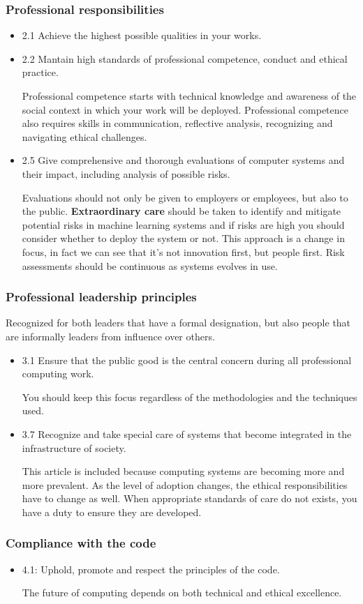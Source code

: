 \subsubsection{Professional responsibilities}
\begin{itemize}
    \item 2.1 Achieve the highest possible qualities in your works.
    \item 2.2 Mantain high standards of professional competence, conduct and ethical practice. 
    
    Professional competence starts with technical knowledge and awareness of the social context in which your work will be deployed. Professional competence also requires skills in communication, reflective analysis, recognizing and navigating ethical challenges.
    \item 2.5 Give comprehensive and thorough evaluations of computer systems and their impact, including analysis of possible risks. 
    
    Evaluations should not only be given to employers or employees, but also to the public. \textbf{Extraordinary care} should be taken to identify and mitigate potential risks in machine learning systems and if risks are high you should consider whether to deploy the system or not. This approach is a change in focus, in fact we can see that it's not innovation first, but people first. Risk assessments should be continuous as systems evolves in use.
\end{itemize}
\subsubsection{Professional leadership principles}
Recognized for both leaders that have a formal designation, but also people that are informally leaders from influence over others. 
\begin{itemize}
    \item 3.1 Ensure that the public good is the central concern during all professional computing work.
    
    You should keep this focus regardless of the methodologies and the techniques used.
    \item 3.7 Recognize and take special care of systems that become integrated in the infrastructure of society.
    
    This article is included because computing systems are becoming more and more prevalent. As the level of adoption changes, the ethical responsibilities have to change as well. When appropriate standards of care do not exists, you have a duty to ensure they are developed.
\end{itemize}
\subsubsection{Compliance with the code}
\begin{itemize}
    \item 4.1: Uphold, promote and respect the principles of the code.
    
    The future of computing depends on both technical and ethical excellence.
\end{itemize}
